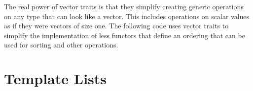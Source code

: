 The real power of vector traits is that they simplify creating generic
operations on any type that can look like a vector. This includes
operations on scalar values as if they were vectors of size one. The
following code uses vector traits to simplify the implementation of less
functors that define an ordering that can be used for sorting
and other operations.




\section{Template Lists}

